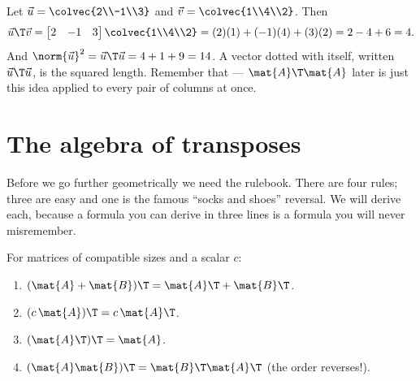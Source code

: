 \begin{example}\label{ch10:ex-dot}
Let $\vec{u}=\colvec{2\\-1\\3}$ and $\vec{v}=\colvec{1\\4\\2}$. Then
\[
  \vec{u}\T\vec{v}
  = \begin{bmatrix} 2 & -1 & 3 \end{bmatrix}\colvec{1\\4\\2}
  = (2)(1)+(-1)(4)+(3)(2) = 2-4+6 = 4.
\]
And $\norm{\vec{u}}^2 = \vec{u}\T\vec{u} = 4+1+9 = 14$. A vector dotted with itself, written
$\vec{u}\T\vec{u}$, is the squared length. Remember that --- $\mat{A}\T\mat{A}$ later is just this
idea applied to every pair of columns at once.
\end{example}

\section{The algebra of transposes}

Before we go further geometrically we need the rulebook. There are four rules; three are easy and
one is the famous ``socks and shoes'' reversal. We will derive each, because a formula you can
derive in three lines is a formula you will never misremember.

\begin{theorem}\label{ch10:thm-rules}
For matrices of compatible sizes and a scalar $c$:
\begin{enumerate}
  \item $(\mat{A}+\mat{B})\T = \mat{A}\T + \mat{B}\T$.
  \item $(c\,\mat{A})\T = c\,\mat{A}\T$.
  \item $(\mat{A}\T)\T = \mat{A}$.
  \item $(\mat{A}\mat{B})\T = \mat{B}\T\mat{A}\T$ \quad(the order reverses!).
\end{enumerate}
\end{theorem}

